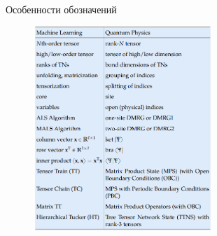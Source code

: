 \begin{frame}{Особенности обозначений}
\begin{figure}
    \centering
    \includegraphics[width=0.6\textwidth]{lecture_10/figs/notation_diff.png}
\end{figure}
\end{frame}

